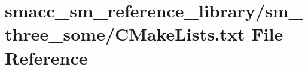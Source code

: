 \hypertarget{smacc__sm__reference__library_2sm__three__some_2CMakeLists_8txt}{}\section{smacc\+\_\+sm\+\_\+reference\+\_\+library/sm\+\_\+three\+\_\+some/\+C\+Make\+Lists.txt File Reference}
\label{smacc__sm__reference__library_2sm__three__some_2CMakeLists_8txt}
